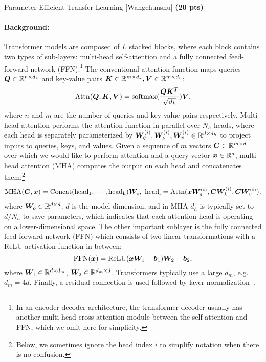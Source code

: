 \begin{question}{
Parameter-Efficient Transfer Learning [Wangchunshu] \textbf{(20 pts)}}

\paragraph{Background:}
Transformer models are composed of $L$ stacked blocks, where each block contains two types of sub-layers: multi-head self-attention and a fully connected feed-forward network (FFN).\footnote{In an encoder-decoder architecture, the transformer decoder usually has another multi-head cross-attention module between the self-attention and FFN, which we omit here for simplicity.} 
The conventional attention function maps queries ${\bm{Q}}\in \mathbb{R}^{n\times d_k}$ and key-value pairs ${\bm{K}} \in \mathbb{R}^{m\times d_k}, {\bm{V}} \in \mathbb{R}^{m\times d_v}$:
\begin{equation}
    \mathrm{Attn}({\bm{Q}}, {\bm{K}}, {\bm{V}}) = \text{softmax}(\frac{{\bm{Q}}{\bm{K}}^T}{\sqrt{d_k}}){\bm{V}},
\end{equation}
where $n$ and $m$ are the number of queries and key-value pairs respectively.
Multi-head attention performs the attention function in parallel over $N_h$ heads, where each head is separately parameterized by ${\bm{W}}_q^{(i)}, {\bm{W}}_k^{(i)}, {\bm{W}}_v^{(i)} \in {\mathbb{R}}^{d\times d_h}$ to project inputs to queries, keys, and values. Given a sequence of $m$ vectors ${\bm{C}} \in {\mathbb{R}}^{m\times d}$ over which we would like to perform attention and a query vector ${\bm{x}}\in{\mathbb{R}}^d$, 
multi-head attention (MHA) computes the output on each head and concatenates them:\footnote{Below, we sometimes ignore the head index $i$ to simplify notation when there is no confusion.}
\begin{equation}
\begin{aligned}
    \mathrm{MHA}({\bm{C}}, {\bm{x}}) =  \mathrm{Concat(head_1, \cdots, head_h)}{\bm{W}}_o, \
    \mathrm{head_i} = \mathrm{Attn}({\bm{x}}{\bm{W}}_q^{(i)}, {\bm{C}}{\bm{W}}_k^{(i)}, {\bm{C}}{\bm{W}}_v^{(i)}), 
    \label{eq:multihead:attn}
\end{aligned}
\end{equation}
where ${\bm{W}}_o \in {\mathbb{R}}^{d\times d}$.
$d$ is the model dimension, and 
in MHA $d_h$ is typically set to $d / N_h$ to save parameters, which indicates that each attention head is operating on a lower-dimensional space. 
The other important sublayer is the fully connected feed-forward network (FFN) which consists of two linear transformations with a ReLU activation function in between:
\begin{equation}
    \mathrm{FFN}({\bm{x}}) = \mathrm{ReLU}({\bm{x}}{\bm{W}}_1 +{\bm{b}}_1){\bm{W}}_2 + {\bm{b}}_2,
\end{equation}
where ${\bm{W}}_1 \in \mathbb{R}^{d\times d_m}$, ${\bm{W}}_2 \in {\mathbb{R}}^{d_m\times d}$. Transformers typically use a large $d_m$, e.g. $d_m=4d$. 
Finally, a residual connection is used followed by layer normalization~\citep{ba2016layer}.



\end{question}
